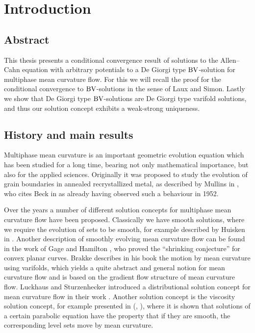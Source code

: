 \chapter{Introduction}

\section{Abstract}

This thesis presents a conditional convergence result of solutions to the 
Allen--Cahn equation with arbitrary potentials to a De Giorgi type $ \operatorname{BV} 
$-solution for multiphase mean 
curvature flow. For this we will recall the proof for the conditional 
convergence to $ \operatorname{BV} $-solutions in 
the sense of Laux and Simon. Lastly we show that De Giorgi type $ \operatorname{BV} 
$-solutions are De Giorgi type varifold solutions, and thus our solution 
concept exhibits a 
weak-strong uniqueness.

\section{History and main results}

Multiphase mean curvature is an important geometric evolution equation which 
has been studied for a long time, bearing not only mathematical importance, but 
also for the applied sciences. Originally it was proposed to study the 
evolution of grain boundaries in annealed recrystallized metal, as described by
Mullins in \cite{mullins_two_dimensional_motion_of_idealized_grain_boundaries}, 
who cites Beck in \cite{beck_metal_interfaces} as already having observed such 
a behaviour in 1952. 

Over the years a number of different solution concepts for multiphase mean 
curvature flow have been proposed. Classically we have smooth solutions, where 
we require the evolution of sets to be smooth, for example described by Huisken 
in \cite{huisken_asymptotic_behavior_for_singuliarities_of_mcf}. 
Another description of smoothly evolving mean curvature flow can be found in 
the work of Gage and Hamilton 
\cite{gage_hamilton_the_heat_equation_shrinking_convex_plane_curves}, who 
proved the \enquote{shrinking conjecture} for convex planar curves.
Brakke describes in his book 
\cite{brakke_kenneth_motion_of_surface_by_mean_curvature} the motion by mean 
curvature using varifolds, which yields a quite abstract and general notion for 
mean curvature flow and is based on the gradient flow structure of mean 
curvature flow. 
Luckhaus and Sturzenhecker introduced a 
distributional solution concept for mean curvature flow in their work 
\cite{luckhaus_sturzenhecker_implicit_time_discretization_for_mcf}. Another 
solution concept is the viscosity solution concept, for example presented in 
(\cite{chen_giga_goto_uniqueness_and_existence_of_generalized_mcf_equations},
\cite{evans_spruck_motion_of_level_sets_by_mean_curvature}), where it is shown 
that solutions of a certain parabolic equation have the property that if they 
are smooth, the corresponding level sets move by mean curvature.

